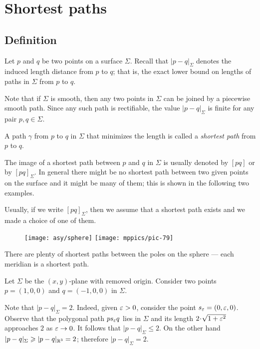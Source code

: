 \chapter{Shortest paths}




\section{Definition}

Let $p$ and $q$ be two points on a surface $\Sigma$.
Recall that $|p-q|_\Sigma$ denotes the induced length distance from $p$ to $q$;
that is, the exact lower bound on lengths of paths in $\Sigma$ from $p$ to $q$.

Note that if $\Sigma$ is smooth, then any two points in $\Sigma$ can be joined by a piecewise smooth path.
Since any such path is rectifiable, the value $|p-q|_\Sigma$ is finite for any pair $p,q\in\Sigma$.

A path $\gamma$ from $p$ to $q$ in $\Sigma$ that minimizes the length is called a \emph{shortest path} from $p$ to $q$.

The image of a shortest path between $p$ and $q$ in $\Sigma$ is usually denoted by $[pq]$ or by $[pq]_\Sigma$.
In general there might be no shortest path between two given points on the surface
and it might be many of them;
this is shown in the following two examples.

Usually, if we write $[pq]_\Sigma$, then we assume that a shortest path exists and we made a choice of one of them.

\begin{wrapfigure}{r}{28 mm}
\vskip-4mm
\centering
\texttt{[image: asy/sphere]}
\bigskip
\texttt{[image: mppics/pic-79]}
\end{wrapfigure}

 There are plenty of shortest paths between the poles on the sphere --- each meridian is a shortest path.

 Let $\Sigma$ be the $(x,y)$-plane with removed origin.
Consider two points $p=(1,0,0)$ and $q=(-1,0,0)$ in $\Sigma$.

Note that $|p-q|_\Sigma=2$. 
Indeed, given $\eps\z>0$, consider the point $s_\varepsilon=(0,\varepsilon,0)$.
Observe that the polygonal path $ps_\varepsilon q$ lies in $\Sigma$ and its length $2\cdot\sqrt{1+\eps^2}$ approaches $2$ as $\varepsilon\to0$.
It follows that $|p-q|_\Sigma\le 2$.
On the other hand $|p-q|_\Sigma\geqslant |p-q|_{\mathbb{R}^3}=2$; therefore $|p-q|_\Sigma= 2$.


